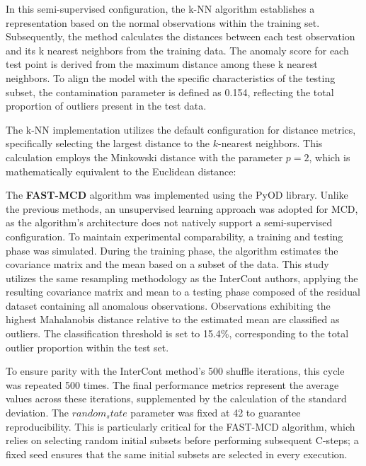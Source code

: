 In this semi-supervised configuration, the k-NN algorithm establishes a representation based on the normal observations within the training set. 
Subsequently, the method calculates the distances between each test observation and its k nearest neighbors from the training data. 
The anomaly score for each test point is derived from the maximum distance among these k nearest neighbors. 
To align the model with the specific characteristics of the testing subset, the contamination parameter is defined as 0.154, reflecting the total proportion of outliers present in the test data.


The k-NN implementation utilizes the default configuration for distance metrics, specifically selecting the largest distance to the $k$-nearest neighbors. 
This calculation employs the Minkowski distance with the parameter $p=2$, which is mathematically equivalent to the Euclidean distance:


The \textbf{FAST-MCD} algorithm was implemented using the PyOD library. 
Unlike the previous methods, an unsupervised learning approach was adopted for MCD, as the algorithm's architecture does not natively support a semi-supervised configuration. 
To maintain experimental comparability, a training and testing phase was simulated. 
During the training phase, the algorithm estimates the covariance matrix and the mean based on a subset of the data. 
This study utilizes the same resampling methodology as the InterCont authors, applying the resulting covariance matrix and mean to a testing phase composed of the residual dataset containing all anomalous observations. 
Observations exhibiting the highest Mahalanobis distance relative to the estimated mean are classified as outliers. 
The classification threshold is set to 15.4\%, corresponding to the total outlier proportion within the test set.

To ensure parity with the InterCont method's 500 shuffle iterations, this cycle was repeated 500 times. 
The final performance metrics represent the average values across these iterations, supplemented by the calculation of the standard deviation. 
The $random_state$ parameter was fixed at 42 to guarantee reproducibility. 
This is particularly critical for the FAST-MCD algorithm, which relies on selecting random initial subsets before performing subsequent C-steps; a fixed seed ensures that the same initial subsets are selected in every execution.

